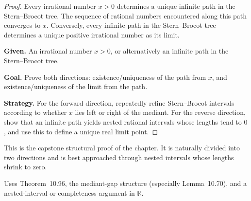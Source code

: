 \begin{proof}
\Claim Every irrational number $x>0$ determines a unique infinite path in the Stern--Brocot tree.  The sequence of rational numbers encountered along this path converges to $x$.
Conversely, every infinite path in the Stern--Brocot tree determines a unique positive irrational number as its limit.

\textbf{Given.} An irrational number $x>0$, or alternatively an infinite path in the Stern--Brocot tree.

\textbf{Goal.} Prove both directions: existence/uniqueness of the path from $x$, and existence/uniqueness of the limit from the path.

\textbf{Strategy.} For the forward direction, repeatedly refine Stern--Brocot intervals according to whether $x$ lies left or right of the mediant.  For the reverse direction, show that an infinite path yields nested rational intervals whose lengths tend to $0$, and use this to define a unique real limit point.


\end{proof}

\begin{remark*}
This is the capstone structural proof of the chapter.  It is naturally divided
into two directions and is best approached through nested intervals whose
lengths shrink to zero.
\end{remark*}

\begin{remark*}[Dependencies]
Uses Theorem~10.96, the mediant-gap structure (especially Lemma~10.70), and a
nested-interval or completeness argument in $\mathbb{R}$.
\end{remark*}
